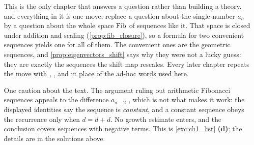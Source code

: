 \begin{ainote}
This is the only chapter that answers a question rather than building a theory,
and everything in it is one move: replace a question about the single number
$a_n$ by a question about the whole space $\operatorname{Fib}$ of sequences like it. That space
is closed under addition and scaling (\cref{prop:fib_closure}), so a formula for
two convenient sequences yields one for all of them. The convenient ones are the
geometric sequences, and \cref{prop:eigenvectors_shift} says why they were not a
lucky guess: they are exactly the sequences the shift map rescales. Every later
chapter repeats the move with , ,  and
 in place of the ad-hoc words used here.

One caution about the text. The argument ruling out arithmetic Fibonacci
sequences appeals to the difference $a_{n-2}$ , which is not what
makes it work: the displayed identities say the sequence is \emph{constant}, and
a constant sequence obeys the recurrence only when $d = d + d$. No growth
estimate enters, and the conclusion covers sequences with negative terms. This is
\cref{exc:ch1_list} \textbf{(d)}; the details are in the solutions above.
\end{ainote}




